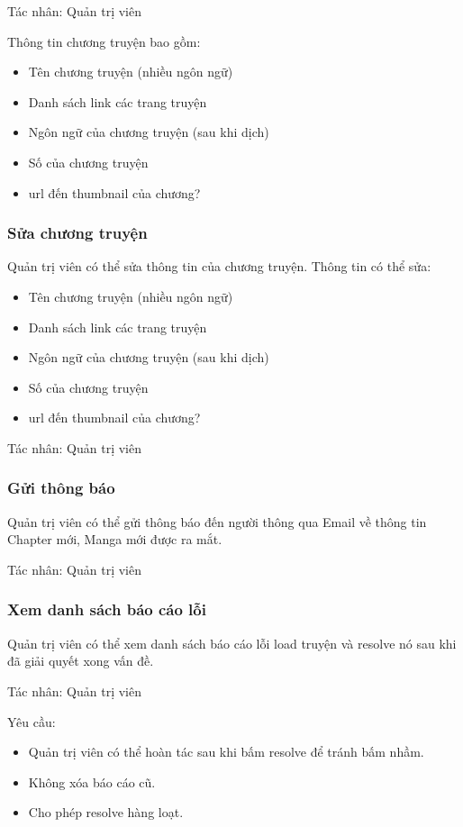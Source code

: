\documentclass[./../main.tex]{subfiles}
\begin{document}
Tác nhân: Quản trị viên


Thông tin chương truyện bao gồm:
\begin{itemize}
\item Tên chương truyện (nhiều ngôn ngữ)
\item Danh sách link các trang truyện
\item Ngôn ngữ của chương truyện (sau khi dịch)
\item Số của chương truyện
\item url đến thumbnail của chương?
\end{itemize}

\subsubsection{Sửa chương truyện}
Quản trị viên có thể sửa thông tin của chương truyện. Thông tin có thể sửa:
\begin{itemize}
\item Tên chương truyện (nhiều ngôn ngữ)
\item Danh sách link các trang truyện
\item Ngôn ngữ của chương truyện (sau khi dịch)
\item Số của chương truyện
\item url đến thumbnail của chương?
\end{itemize}

Tác nhân: Quản trị viên

\subsubsection{Gửi thông báo}
Quản trị viên có thể gửi thông báo đến người thông qua Email về thông tin Chapter mới, Manga mới được ra mắt.


Tác nhân: Quản trị viên

\subsubsection{Xem danh sách báo cáo lỗi}
Quản trị viên có thể xem danh sách báo cáo lỗi load truyện và resolve nó sau khi đã giải quyết xong vấn đề.


Tác nhân: Quản trị viên


Yêu cầu:
\begin{itemize}
\item Quản trị viên có thể hoàn tác sau khi bấm resolve để tránh bấm nhầm.
\item Không xóa báo cáo cũ.
\item Cho phép resolve hàng loạt.
\end{itemize}
\end{document}
